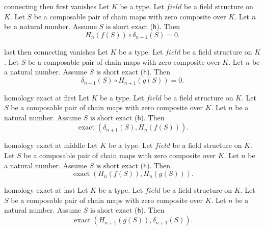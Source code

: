 \begin{cleanresult}{connecting then first vanishes}
Let $K$ be a type.
Let $\mathit{field}$ be a field structure on $K$.
Let $S$ be a composable pair of chain maps with zero composite over $K$.
Let $n$ be a natural number.
Assume $S\text{ is short exact}$ (\texttt{h}).
Then \[H_{n}(f(S))\circ\delta_{n+1}(S)=0.\]
\end{cleanresult}

\begin{cleanresult}{last then connecting vanishes}
Let $K$ be a type.
Let $\mathit{field}$ be a field structure on $K$.
Let $S$ be a composable pair of chain maps with zero composite over $K$.
Let $n$ be a natural number.
Assume $S\text{ is short exact}$ (\texttt{h}).
Then \[\delta_{n+1}(S)\circ H_{n+1}(g(S))=0.\]
\end{cleanresult}

\begin{cleanresult}{homology exact at first}
Let $K$ be a type.
Let $\mathit{field}$ be a field structure on $K$.
Let $S$ be a composable pair of chain maps with zero composite over $K$.
Let $n$ be a natural number.
Assume $S\text{ is short exact}$ (\texttt{h}).
Then \[\operatorname{exact}(\delta_{n+1}(S),H_{n}(f(S))).\]
\end{cleanresult}

\begin{cleanresult}{homology exact at middle}
Let $K$ be a type.
Let $\mathit{field}$ be a field structure on $K$.
Let $S$ be a composable pair of chain maps with zero composite over $K$.
Let $n$ be a natural number.
Assume $S\text{ is short exact}$ (\texttt{h}).
Then \[\operatorname{exact}(H_{n}(f(S)),H_{n}(g(S))).\]
\end{cleanresult}

\begin{cleanresult}{homology exact at last}
Let $K$ be a type.
Let $\mathit{field}$ be a field structure on $K$.
Let $S$ be a composable pair of chain maps with zero composite over $K$.
Let $n$ be a natural number.
Assume $S\text{ is short exact}$ (\texttt{h}).
Then \[\operatorname{exact}(H_{n+1}(g(S)),\delta_{n+1}(S)).\]
\end{cleanresult}

